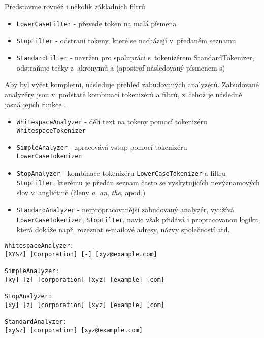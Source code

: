 \documentclass[11pt,oneside]{fithesis2}
\begin{document}
Představme rovněž i několik základních filtrů  \cite[s.~118]{LuceneAction}
\begin{itemize}
	\item \texttt{LowerCaseFilter} - převede token na malá písmena
	\item \texttt{StopFilter} - odstraní tokeny, které se nacházejí v~předaném seznamu
	\item \texttt{StandardFilter} - navržen pro spolupráci s~tokenizérem StandardTokenizer, odstraňuje tečky z~akronymů a  (apostrof následovaný písmenem s)
\end{itemize}

Aby byl výčet kompletní, následuje přehled zabudovaných analyzérů. Zabudované analyzéry jsou v~podstatě kombinací tokenizérů a filtrů, z~čehož je následně jasná jejich funkce  \cite[s.~112]{LuceneAction}.

\begin{itemize}
	\item \texttt{WhitespaceAnalyzer} - dělí text na tokeny pomocí tokenizéru \\ \texttt{WhitespaceTokenizer}
	\item \texttt{SimpleAnalyzer} - zpracovává vstup pomocí tokenizéru \\ \texttt{LowerCaseTokenizer}
	\item \texttt{StopAnalyzer} - kombinace tokenizéru \texttt{LowerCaseTokenizer} a filtru \texttt{StopFilter}, kterému je předán seznam často se vyskytujících nevýznamových slov v~angličtině (členy \emph{a}, \emph{an}, \emph{the}, apod.)
	\item \texttt{StandardAnalyzer} - nejpropracovanější zabudovaný analyzér, využívá \texttt{LowerCaseTokenizer}, \texttt{StopFilter}, navíc však přidává i propracovanou logiku, která dokáže např. rozeznat e-mailové adresy, názvy společností atd.
\end{itemize}

\begin{lstlisting}[caption =  Použití zabudovaných analyzérů pro větu {\emph{\uv{XY\&Z Corporation - xyz@example.com}}}{,} převzato z {\cite[str. 112]{LuceneAction}} , label = AnalysisExample2]
WhitespaceAnalyzer:
[XY&Z] [Corporation] [-] [xyz@example.com]

SimpleAnalyzer:
[xy] [z] [corporation] [xyz] [example] [com]

StopAnalyzer:
[xy] [z] [corporation] [xyz] [example] [com]

StandardAnalyzer:
[xy&z] [corporation] [xyz@example.com]
\end{lstlisting}
\end{document}
